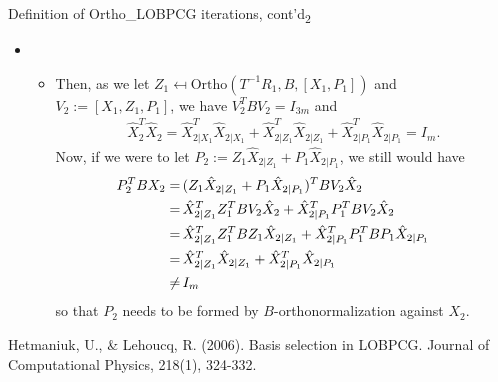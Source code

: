\documentclass[t,usepdftitle=false]{beamer}
\begin{document}
\begin{frame}{Definition of Ortho\_LOBPCG iterations, cont'd\textsubscript{2}}
	\begin{itemize}
	\item[]
	\begin{itemize} 
	\item Then, as we let $Z_1\mapsfrom\text{Ortho}(T^{-1}R_1,B,[X_1,P_1])$ and $V_{2}:=[X_1,Z_1,P_1]$, we have $V_2^TBV_2=I_{3m}$ and
	\begin{align*}
	\hat{X}_2^T\hat{X}_2=\hat{X}_{2|X_1}^T\hat{X}_{2|X_1}+\hat{X}_{2|Z_1}^T\hat{X}_{2|Z_1}+\hat{X}_{2|P_1}^T\hat{X}_{2|P_1}=I_m.
	\end{align*}	
	Now, if we were to let $P_2:=Z_1\hat{X}_{2|Z_1}+P_1\hat{X}_{2|P_1}$, we still would have 
	\begin{align*}
	\hspace{-.55cm}
	P_2^TBX_2
	=&\,(Z_1\hat{X}_{2|Z_1}+P_1\hat{X}_{2|P_1})^TBV_2\hat{X}_2\\
	=&\,\hat{X}_{2|Z_1}^TZ_1^TBV_2\hat{X}_2+\hat{X}_{2|P_1}^TP_1^TBV_2\hat{X}_2\\
	=&\,\hat{X}_{2|Z_1}^TZ_1^TBZ_1\hat{X}_{2|Z_1}+\hat{X}_{2|P_1}^TP_1^TBP_1\hat{X}_{2|P_1}\\
	=&\,\hat{X}_{2|Z_1}^T\hat{X}_{2|Z_1}+\hat{X}_{2|P_1}^T\hat{X}_{2|P_1}\\
	\neq&\, I_m
	\end{align*}
	so that $P_2$ needs to be formed by $B$-orthonormalization against $X_2$.
	\end{itemize}
	\end{itemize}
	\medskip
	\tiny{Hetmaniuk, U., \& Lehoucq, R. (2006). Basis selection in LOBPCG. Journal of Computational Physics, 218(1), 324-332.}
\end{frame}
\end{document}
